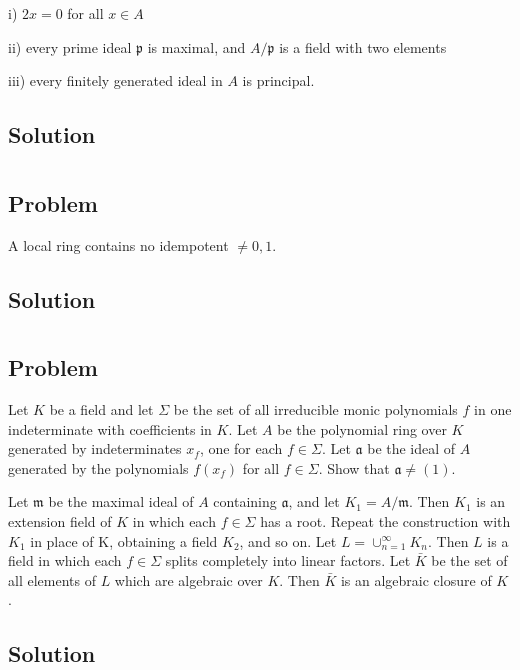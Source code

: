 \documentclass[book,12pt,oneside,openany]{memoir}
\begin{document}
i) $2x = 0$ for all $x \in A$

ii) every prime ideal $\mathfrak{p}$ is maximal, and $A/\mathfrak{p}$ is a field with two elements

iii) every finitely generated ideal in $A$ is principal.
\subsection{Solution}



\section{}
\subsection{Problem}
A local ring contains no idempotent $\neq 0,1$.
\subsection{Solution}



\section{}
\subsection{Problem}
Let $K$ be a field and let $\Sigma$ be the set of all irreducible monic polynomials $f$ in one indeterminate with coefficients in $K$. Let $A$ be the polynomial ring over $K$ generated by indeterminates $x_f$, one for each $f \in \Sigma$. Let $\mathfrak{a}$ be the ideal of $A$ generated by the polynomials $f(x_f)$ for all $f \in \Sigma$. Show that $\mathfrak{a} \neq (1)$.

Let $\mathfrak{m}$ be the maximal ideal of $A$ containing $\mathfrak{a}$, and let $K_1 = A/\mathfrak{m}$. Then $K_1$ is an extension field of $K$ in which each $f \in \Sigma$ has a root. Repeat the construction with $K_1$ in place of K, obtaining a field $K_2$, and so on. Let $L = \cup_{n=1}^{\infty} K_n$. Then $L$ is a field in which each $f \in \Sigma$ splits completely into linear factors. Let $\bar{K}$ be the set of all elements of $L$ which are algebraic over $K$. Then $\bar{K}$ is an algebraic closure of $K$.
\subsection{Solution}
\end{document}
